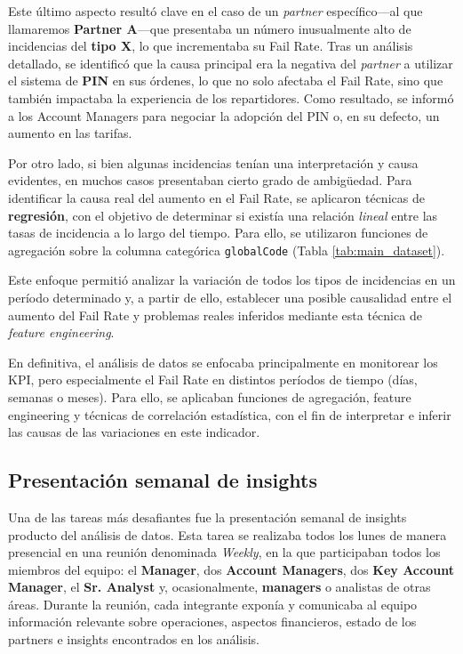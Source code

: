 Este último aspecto resultó clave en el caso de un \textit{partner} específico—al que llamaremos \textbf{Partner A}—que presentaba un número inusualmente alto de incidencias del \textbf{tipo X}, lo que incrementaba su Fail Rate. Tras un análisis detallado, se identificó que la causa principal era la negativa del \textit{partner} a utilizar el sistema de \textbf{PIN} en sus órdenes, lo que no solo afectaba el Fail Rate, sino que también impactaba la experiencia de los repartidores. Como resultado, se informó a los Account Managers para negociar la adopción del PIN o, en su defecto, un aumento en las tarifas.

Por otro lado, si bien algunas incidencias tenían una interpretación y causa evidentes, en muchos casos presentaban cierto grado de ambigüedad. Para identificar la causa real del aumento en el Fail Rate, se aplicaron técnicas de \textbf{regresión}, con el objetivo de determinar si existía una relación \textit{lineal} entre las tasas de incidencia a lo largo del tiempo. Para ello, se utilizaron funciones de agregación sobre la columna categórica \texttt{globalCode} (Tabla \ref{tab:main_dataset}).

Este enfoque permitió analizar la variación de todos los tipos de incidencias en un período determinado y, a partir de ello, establecer una posible causalidad entre el aumento del Fail Rate y problemas reales inferidos mediante esta técnica de \textit{feature engineering}.

En definitiva, el análisis de datos se enfocaba principalmente en monitorear los KPI, pero especialmente el Fail Rate en distintos períodos de tiempo (días, semanas o meses). Para ello, se aplicaban funciones de agregación, feature engineering y técnicas de correlación estadística, con el fin de interpretar e inferir las causas de las variaciones en este indicador.


\subsection{Presentación semanal de insights}

Una de las tareas más desafiantes fue la presentación semanal de insights producto del análisis de datos. Esta tarea se realizaba todos los lunes de manera presencial en una reunión denominada \textit{Weekly}, en la que participaban todos los miembros del equipo: el \textbf{Manager}, dos \textbf{Account Managers}, dos \textbf{Key Account Manager}, el \textbf{Sr. Analyst} y, ocasionalmente, \textbf{managers} o analistas de otras áreas. Durante la reunión, cada integrante exponía y comunicaba al equipo información relevante sobre operaciones, aspectos financieros, estado de los partners e insights encontrados en los análisis.


